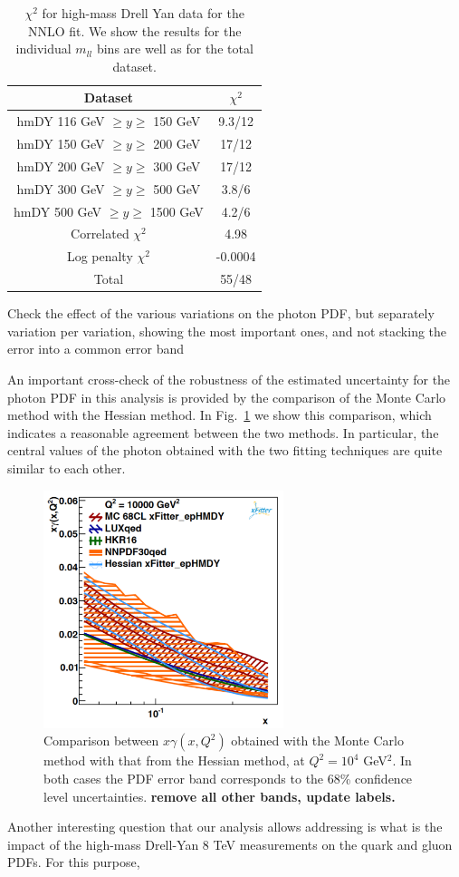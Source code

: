 \begin{table}[h]
  \centering
  \begin{tabular}{|c|c|}
    \hline
    Dataset  &   $\chi^2$ \\
    \hline
    \hline
    hmDY  116 GeV $\ge y\ge $ 150 GeV  &  9.3/12 \\
    hmDY  150 GeV $\ge y\ge $ 200 GeV  &  17/12 \\
    hmDY  200 GeV $\ge y\ge $ 300 GeV  &  17/12 \\
    hmDY  300 GeV $\ge y\ge $ 500 GeV  &  3.8/6 \\
    hmDY  500 GeV $\ge y\ge $ 1500 GeV  &  4.2/6 \\
    \hline
    Correlated $\chi^2$ & 4.98 \\
    Log penalty $\chi^2$  & -0.0004 \\
    \hline
    \hline
    Total  & 55/48 \\
    \hline
    \end{tabular}
  \caption{$\chi^{2}$ for high-mass Drell Yan data for the NNLO fit.
    We show the results for the individual $m_{ll}$ bins
    are well as for the total dataset.
\label{tab:chi2fit}
  }
\end{table}


Check the effect of the various variations on the photon PDF, but separately variation per variation,
showing the most important ones, and not stacking the error into a common error band


An important cross-check of the robustness of the estimated uncertainty for the photon
PDF in this analysis is provided by the comparison of the Monte Carlo method
with the Hessian method.
%
In Fig.~\ref{fig:photon_mc_vs_hessian} we show this comparison,
which indicates a reasonable agreement between the two methods.
%
In particular, the central values of the photon obtained with the two fitting
techniques are quite similar to each other.

\begin{figure}[h]
\centering
\includegraphics[width=7cm]{figs/photon_mc_vs_hessian} 
\caption{Comparison between $x\gamma(x,Q^2)$ obtained with the
  Monte Carlo method with that from the Hessian method,
  at $Q^2=10^4$ GeV$^2$.
  In both cases the PDF error band corresponds to the 68\% confidence level
  uncertainties. {\bf remove all other bands, update labels.}
}
\label{fig:photon_mc_vs_hessian}
\end{figure}

Another interesting question that our analysis allows addressing is what is
the impact of the high-mass Drell-Yan 8 TeV measurements on the quark and gluon
PDFs.
%
For this purpose, 
